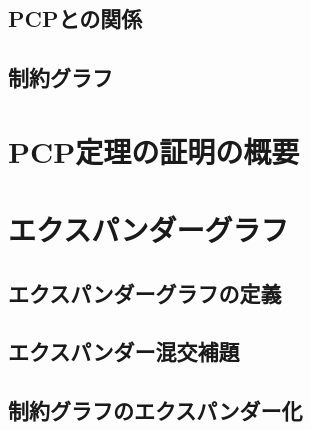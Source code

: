 \subsection{PCPとの関係}
\subsection{制約グラフ}

\section{PCP定理の証明の概要}

\section{エクスパンダーグラフ}
\subsection{エクスパンダーグラフの定義}
\subsection{エクスパンダー混交補題}
\subsection{制約グラフのエクスパンダー化}